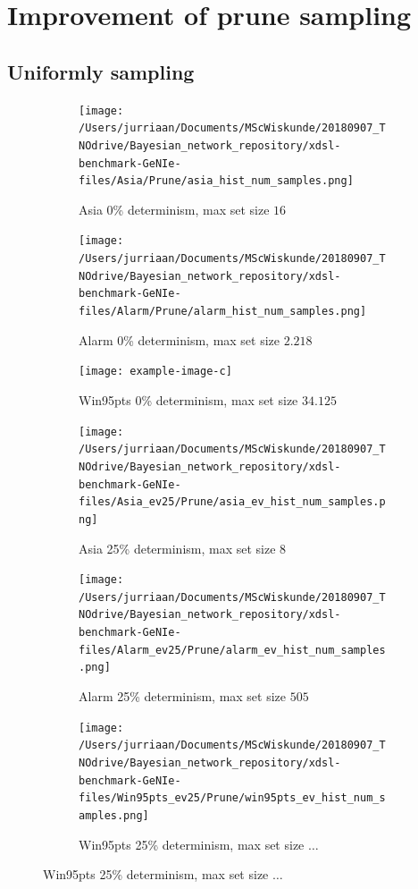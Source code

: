 \documentclass[a4paper, twoside, 11pt]{report}
\theoremstyle{plain}
\theoremstyle{definition}
\theoremstyle{remark}
\begin{document}
\chapter{Improvement of prune sampling}
\section{Uniformly sampling}
\begin{figure}[h!]
\centering
\captionsetup[subfigure]{justification=centering}

\begin{subfigure}{.3\linewidth}
\texttt{[image: /Users/jurriaan/Documents/MScWiskunde/20180907\_TNOdrive/Bayesian\_network\_repository/xdsl-benchmark-GeNIe-files/Asia/Prune/asia\_hist\_num\_samples.png]}
\caption{Asia 0\% determinism, max set size $16$}%
\label{asia_ev}%
\end{subfigure}\hfill%
\begin{subfigure}{.3\linewidth}
\texttt{[image: /Users/jurriaan/Documents/MScWiskunde/20180907\_TNOdrive/Bayesian\_network\_repository/xdsl-benchmark-GeNIe-files/Alarm/Prune/alarm\_hist\_num\_samples.png]}
\caption{Alarm 0\% determinism, max set size $2.218$}%
\label{alarm_ev}%
\end{subfigure}\hfill%
\begin{subfigure}{.3\linewidth}
\texttt{[image: example-image-c]}
\caption{Win95pts 0\% determinism, max set size $34.125$}%
\label{win95pts_ev}%
\end{subfigure}\hfill%

\begin{subfigure}{.3\linewidth}
\texttt{[image: /Users/jurriaan/Documents/MScWiskunde/20180907\_TNOdrive/Bayesian\_network\_repository/xdsl-benchmark-GeNIe-files/Asia\_ev25/Prune/asia\_ev\_hist\_num\_samples.png]}
\caption{Asia 25\% determinism, max set size $8$}%
\label{asia_ev}%
\end{subfigure}\hfill%
\begin{subfigure}{.3\linewidth}
\texttt{[image: /Users/jurriaan/Documents/MScWiskunde/20180907\_TNOdrive/Bayesian\_network\_repository/xdsl-benchmark-GeNIe-files/Alarm\_ev25/Prune/alarm\_ev\_hist\_num\_samples.png]}
\caption{Alarm 25\% determinism, max set size $505$}%
\label{alarm_ev}%
\end{subfigure}\hfill%
\begin{subfigure}{.3\linewidth}
\texttt{[image: /Users/jurriaan/Documents/MScWiskunde/20180907\_TNOdrive/Bayesian\_network\_repository/xdsl-benchmark-GeNIe-files/Win95pts\_ev25/Prune/win95pts\_ev\_hist\_num\_samples.png]}
\caption{Win95pts 25\% determinism, max set size $\ldots$}%
\label{win95pts_ev}%
\end{subfigure}\hfill%


\end{figure}
\end{document}
